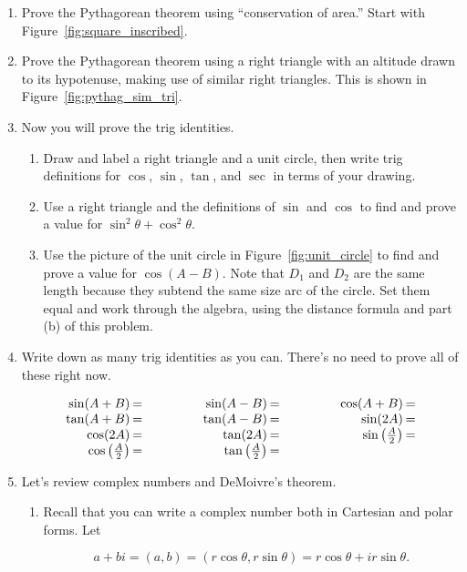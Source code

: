 \documentclass[../gatm.tex]{subfiles}
\begin{document}
\begin{enumerate}
\item Prove the Pythagorean theorem using ``conservation of area.'' Start with Figure~\ref{fig:square_inscribed}.
\item Prove the Pythagorean theorem using a right triangle with an altitude drawn to its hypotenuse, making use of similar right triangles. This is shown in Figure~\ref{fig:pythag_sim_tri}.
\item Now you will prove the trig identities.
\begin{enumerate}
\item Draw and label a right triangle and a unit circle, then write trig definitions for $\cos$, $\sin$, $\tan$, and $\sec$ in terms of your drawing.
\item Use a right triangle and the definitions of $\sin$ and $\cos$ to find and prove a value for $\sin^2 \theta + \cos^2 \theta$.
\item Use the picture of the unit circle in Figure~\ref{fig:unit_circle} to find and prove a value for $\cos(A-B)$. Note that $D_1$ and $D_2$ are the same length because they subtend the same size arc of the circle. Set them equal and work through the algebra, using the distance formula and part (b) of this problem.
\end{enumerate}
\item Write down as many trig identities as you can. There's no need to prove all of these right now.

\renewcommand{\arraystretch}{1.1}
$$\arraycolsep=1pt\begin{array}{rlrlrl}
\sin(A+B)&=\qquad\qquad\phantom{.}&\sin(A-B) &=\qquad\qquad\phantom{.}&\cos(A+B) &= \\
\tan(A+B)&= &\tan(A-B) &= &\sin(2A) &= \\
\cos(2A)&= &\tan(2A) &= &\sin\left(\frac{A}{2}\right) &= \\
\cos\left(\frac{A}{2}\right)&= &\tan\left(\frac{A}{2}\right) &= & & \\
\end{array}$$

\item Let's review complex numbers and DeMoivre's theorem.
\begin{enumerate}
\item Recall that you can write a complex number both in Cartesian and polar forms. Let

$$a+bi=(a,b)=(r\cos\theta,r\sin\theta)=r\cos\theta+ir\sin\theta.$$


\end{enumerate}
\end{enumerate}
\end{document}
